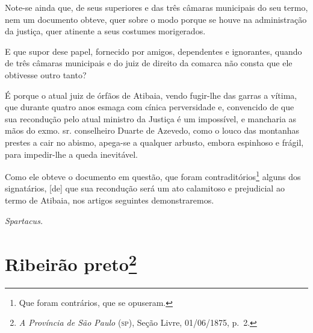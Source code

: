Note-se ainda que, de seus superiores e das três câmaras municipais do
seu termo, nem um documento obteve, quer sobre o modo porque se houve na
administração da justiça, quer atinente a seus costumes morigerados.

E que supor dese papel, fornecido por amigos, dependentes e ignorantes,
quando de três câmaras municipais e do juiz de direito da comarca não
consta que ele obtivesse outro tanto?

É porque o atual juiz de órfãos de Atibaia, vendo fugir-lhe das garras a
vítima, que durante quatro anos esmaga com cínica perversidade e,
convencido de que sua recondução pelo atual ministro da Justiça é um
impossível, e mancharia as mãos do exmo. sr. conselheiro Duarte de
Azevedo, como o louco das montanhas prestes a cair no abismo, apega-se a
qualquer arbusto, embora espinhoso e frágil, para impedir-lhe a queda
inevitável.

Como ele obteve o documento em questão, que foram
contraditórios\footnote{ Que foram contrários, que se opuseram.} alguns
dos signatários, {[}de{]} que sua recondução será um ato calamitoso e
prejudicial ao termo de Atibaia, nos artigos seguintes demonstraremos.

\emph{Spartacus.}

\chapter{Ribeirão preto\footnote{\emph{A Província de São Paulo} (\textsc{sp}), Seção Livre,
  01/06/1875, p.~2.}} %


